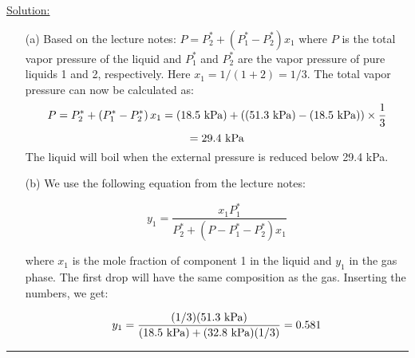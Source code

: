 \noindent
\underline{Solution:}

\begin{itemize}

\item[(a)] Based on the lecture notes: $P = P_2^* + \left(P_1^* - P_2^*\right)x_1$ where $P$ is the total vapor pressure of the liquid and $P_1^*$ and $P_2^*$ are the vapor pressure of pure liquids 1 and 2, respectively. Here $x_1 = 1 / (1 + 2) = 1/3$. The total vapor pressure can now be calculated as:
$$P = P_2^* + \left(P_1^* - P_2^*\right)x_1 = \left(18.5\textnormal{ kPa}\right) + \left((51.3\textnormal{ kPa}) - (18.5\textnormal{ kPa})\right)\times\frac{1}{3}$$
$$ = 29.4\textnormal{ kPa}$$
The liquid will boil when the external pressure is reduced below 29.4 kPa.

\item[(b)] We use the following equation from the lecture notes:

$$y_1 = \frac{x_1P_1^*}{P_2^* + \left(P-P_1^* - P_2^*\right)x_1}$$

where $x_1$ is the mole fraction of component 1 in the liquid and $y_1$ in the gas phase. The first drop will have the same composition as the gas. Inserting the numbers, we get:

$$y_1 = \frac{(1/3)(51.3\textnormal{ kPa})}{(18.5\textnormal{ kPa})+(32.8\textnormal{ kPa})(1/3)} = 0.581$$
\end{itemize}

\hrule\vspace{0.5cm}
